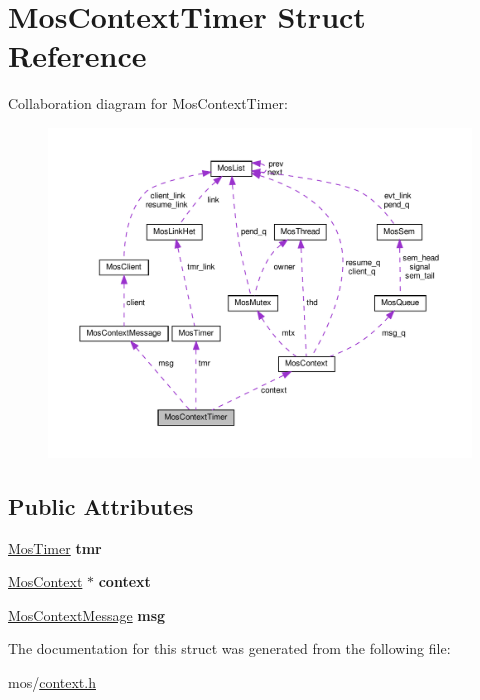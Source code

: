 \hypertarget{structMosContextTimer}{}\section{Mos\+Context\+Timer Struct Reference}
\label{structMosContextTimer}


Collaboration diagram for Mos\+Context\+Timer\+:\nopagebreak
\begin{figure}[H]
\begin{center}
\leavevmode
\includegraphics[width=350pt]{structMosContextTimer__coll__graph}
\end{center}
\end{figure}
\subsection*{Public Attributes}
\begin{DoxyCompactItemize}
\item 
\mbox{\label{structMosContextTimer_a3bd17a42e0b1dfe08327b6271bef0bc1}} 
\hyperlink{structMosTimer}{Mos\+Timer} {\bfseries tmr}
\item 
\mbox{\label{structMosContextTimer_a6c89658eb791d4bbc186f30711f1db04}} 
\hyperlink{structMosContext}{Mos\+Context} $\ast$ {\bfseries context}
\item 
\mbox{\label{structMosContextTimer_a7619e23e27b9693685e190b5cae76d97}} 
\hyperlink{structMosContextMessage}{Mos\+Context\+Message} {\bfseries msg}
\end{DoxyCompactItemize}


The documentation for this struct was generated from the following file\+:\begin{DoxyCompactItemize}
\item 
mos/\hyperlink{context_8h}{context.\+h}\end{DoxyCompactItemize}
